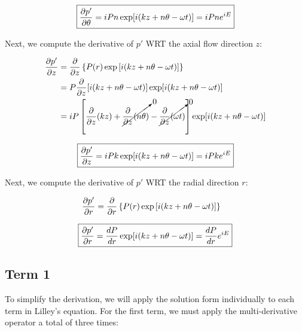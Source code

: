 \documentclass[]{aiaa-tc}%
\begin{document}
\begin{equation} \label{dpdtheta}
\boxed{\dfrac{\partial p'}{\partial \theta} = iPn \exp[i(kz + n\theta -\omega t)] = iPn e^{iE} }
\end{equation}


Next, we compute the derivative of $p'$ WRT the axial flow direction $z$:



\begin{align*}
\dfrac{\partial p'}{\partial z} &= \dfrac{\partial}{\partial z}
  \left\{ P(r) \exp\left[ i(kz + n\theta -\omega t) \right]\right\} \\
&= P \dfrac{\partial}{\partial z} [i(kz + n\theta -\omega t)] \exp[i(kz + n\theta -\omega t)] \\
&= iP \left[             \dfrac{\partial}{\partial z}(kz)
          + \cancelto{0}{\dfrac{\partial}{\partial z}(n\theta)}
          - \cancelto{0}{\dfrac{\partial}{\partial z}(\omega t)}
    \right] \exp[i(kz + n\theta -\omega t)]
\end{align*}

\begin{equation} \label{dpdz}
\boxed{\dfrac{\partial p'}{\partial z} = iPk \exp[i(kz + n\theta -\omega t)] = iPk e^{iE} }
\end{equation}


Next, we compute the derivative of $p'$ WRT the radial direction $r$:

\begin{align*}
\dfrac{\partial p'}{\partial r} &= \dfrac{\partial}{\partial r}
  \left\{ P(r) \exp\left[ i(kz + n\theta -\omega t) \right]\right\}
\end{align*}

\begin{equation} \label{dpdr}
\boxed{\dfrac{\partial p'}{\partial r} = \dfrac{dP}{dr} \exp[i(kz + n\theta -\omega t)] = \dfrac{dP}{dr} e^{iE} }
\end{equation}



\subsection{Term 1}

To simplify the derivation, we will apply the solution form individually to each term in Lilley's equation.  For the first term, we must apply the multi-derivative operator a total of three times:

\end{document}

